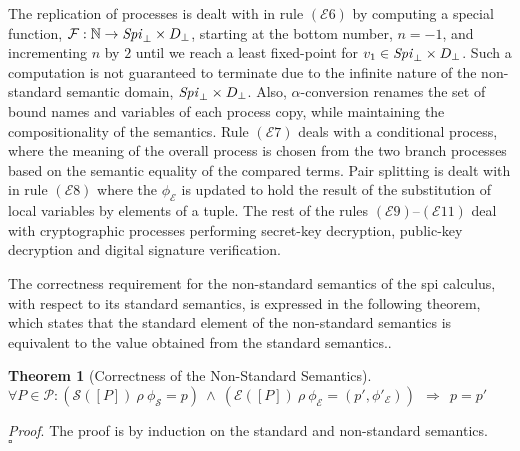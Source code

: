 \documentclass{entcs} \usepackage{entcsmacro}
\begin{document}
The replication of processes is dealt with in rule $(\mathcal{E}6)$ by computing a special function, $\mathcal{F}:\mathbb{N}\to\mbox{{\itshape Spi\/}}_\bot\times D_\bot$, starting at the bottom number, $n=-1$, and incrementing $n$ by $2$ until we reach a least fixed-point for $v_1\in\mbox{{\itshape Spi\/}}_\bot\times D_\bot$.  Such a computation is not guaranteed to terminate due to the infinite nature of the non-standard semantic domain, $\mbox{{\itshape Spi\/}}_\bot\times D_\bot$. Also, $\alpha$-conversion renames the set of bound names and variables of each process copy, while maintaining the compositionality of the semantics. Rule $(\mathcal{E}7)$ deals with a conditional process, where the meaning of the overall process is chosen from the two branch processes based on the semantic equality of the compared terms.  Pair splitting is dealt with in rule $(\mathcal{E}8)$ where the $\phi_\mathcal{E}$ is updated to hold the result of the substitution of local variables by elements of a tuple. The rest of the rules $(\mathcal{E}9)$--$(\mathcal{E}11)$ deal with cryptographic processes performing secret-key decryption, public-key decryption and digital signature verification.

The correctness requirement for the non-standard semantics of the spi calculus, with respect to its standard semantics, is expressed in the following theorem, which states that the standard element of the non-standard semantics is equivalent to the value obtained from the standard semantics..
\newtheorem{theor}{Theorem}
\begin{theor}[Correctness of the Non-Standard Semantics]\label{correctspi}
$ $\\
$\forall P\in\mathcal{P}:(\mathcal{S}(\![P]\!)~\rho~\phi_\mathcal{S}=p)~\wedge~(\mathcal{E}(\![P]\!)~\rho~\phi_\mathcal{E}=(p',\phi'_\mathcal{E}))~~\Rightarrow~~p=p'$
\end{theor}
{\itshape Proof\/}. The proof is by induction on the standard and non-standard semantics.\\$\square$
\end{document}
